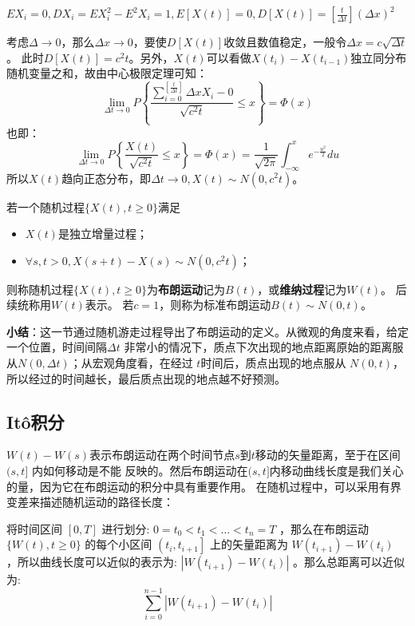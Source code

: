 $EX_i = 0, DX_i = EX^2_i - E^2X_i = 1, E[X(t)]=0, D[X(t)]=[\frac{t}{\Delta t}](\Delta x)^2$

考虑$\Delta \rightarrow 0$，那么$\Delta x \rightarrow 0$，要使$D[X(t)]$收敛且数值稳定，一般令$\Delta x=c\sqrt{\Delta t}$。
此时$D[X(t)]=c^2t$。另外，$X(t)$可以看做$X(t_i) - X(t_{i-1})$独立同分布随机变量之和，故由中心极限定理可知：
\begin{equation}
  \lim _{\Delta t \rightarrow 0} P\left\{\frac{\sum_{i=0}^{\left[\frac{t}{\Delta t}\right]} \Delta x X_i-0}{\sqrt{c^2 t}} \leq x\right\}=\Phi(x)
\end{equation}
也即：
\begin{equation}
  \lim _{\Delta t \rightarrow 0} P\left\{\frac{X(t)}{\sqrt{c^2 t}} \leq x\right\}=\Phi(x)=\frac{1}{\sqrt{2 \pi}} \int_{-\infty}^x e^{-\frac{u^2}{2}} d u
\end{equation}
所以$X(t)$趋向正态分布，即$\Delta t \rightarrow 0, X(t) \sim N(0, c^2t)$。

\begin{definition}
  若一个随机过程$\{X(t), t \geq 0 \}$满足
  \begin{itemize}
    \item[1.] $X(t)$是独立增量过程；
    \item[2.] $\forall s, t>0, X(s+t)-X(s) \sim N\left(0, c^2 t\right)$；
  \end{itemize}
  则称随机过程$\{X(t), t \geq 0 \}$为\textbf{布朗运动}记为$B(t)$，或\textbf{维纳过程}记为$W(t)$。
  后续统称用$W(t)$表示。
  若$c=1$，则称为标准布朗运动$B(t)\sim N(0, t)$。
\end{definition}

\textbf{小结}：这一节通过随机游走过程导出了布朗运动的定义。从微观的角度来看，给定一个位置，时间间隔$\Delta t$
非常小的情况下，质点下次出现的地点距离原始的距离服从$N(0, \Delta t)$；从宏观角度看，在经过
$t$时间后，质点出现的地点服从 $N(0, t)$，所以经过的时间越长，最后质点出现的地点越不好预测。
\subsection{Itô积分}
$W(t) - W(s)$表示布朗运动在两个时间节点$s$到$t$移动的矢量距离，至于在区间 $(s, t]$ 内如何移动是不能
反映的。然后布朗运动在$(s, t]$内移动曲线长度是我们关心的量，因为它在布朗运动的积分中具有重要作用。
在随机过程中，可以采用有界变差来描述随机运动的路径长度：

将时间区间 $[0, T]$ 进行划分: $0=t_0<t_1<\ldots<t_n=T$ ，那么在布朗运动 $\{W(t), t \geq 0\}$ 的每个小区间 $\left(t_i, t_{i+1}\right]$ 上的矢量距离为 $W\left(t_{i+1}\right)-W\left(t_i\right)$ ，所以曲线长度可以近似的表示为: $\left|W\left(t_{i+1}\right)-W\left(t_i\right)\right|$ 。那么总距离可以近似为:
$$
\sum_{i=0}^{n-1}\left|W\left(t_{i+1}\right)-W\left(t_i\right)\right|
$$

